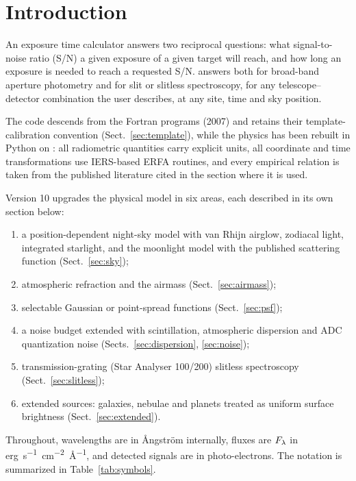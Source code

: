 \section{Introduction}
\label{sec:intro}

An exposure time calculator answers two reciprocal questions: what
signal-to-noise ratio (S/N) a given exposure of a given target will reach, and
how long an exposure is needed to reach a requested S/N. \spetc{} answers both
for broad-band aperture photometry and for slit or slitless spectroscopy, for
any telescope--detector combination the user describes, at any site, time and
sky position.

The code descends from the Fortran  programs (2007) and
retains their template-calibration convention
(Sect.~\ref{sec:template}), while the physics has been rebuilt in Python on
 \citep{astropy2022}: all radiometric quantities carry explicit
units, all coordinate and time transformations use IERS-based ERFA routines,
and every empirical relation is taken from the published literature cited in
the section where it is used.

Version 10 upgrades the physical model in six areas, each described in its own
section below:
\begin{enumerate}
  \item a position-dependent night-sky model with van Rhijn airglow, zodiacal
        light, integrated starlight, and the \citet{krisciunas1991} moonlight
        model with the published scattering function (Sect.~\ref{sec:sky});
  \item atmospheric refraction and the \citet{pickering2002} airmass
        (Sect.~\ref{sec:airmass});
  \item selectable Gaussian or \citet{moffat1969} point-spread functions
        (Sect.~\ref{sec:psf});
  \item a noise budget extended with \citet{young1967} scintillation,
        \citet{filippenko1982} atmospheric dispersion and ADC quantization
        noise (Sects.~\ref{sec:dispersion}, \ref{sec:noise});
  \item transmission-grating (Star Analyser 100/200) slitless spectroscopy
        (Sect.~\ref{sec:slitless});
  \item extended sources: galaxies, nebulae and planets treated as uniform
        surface brightness (Sect.~\ref{sec:extended}).
\end{enumerate}

Throughout, wavelengths are in \AA{}ngstr\"om internally, fluxes are
$F_\lambda$ in \si{erg.s^{-1}.cm^{-2}.\angstrom^{-1}}, and detected signals are in
photo-electrons. The notation is summarized in Table~\ref{tab:symbols}.

